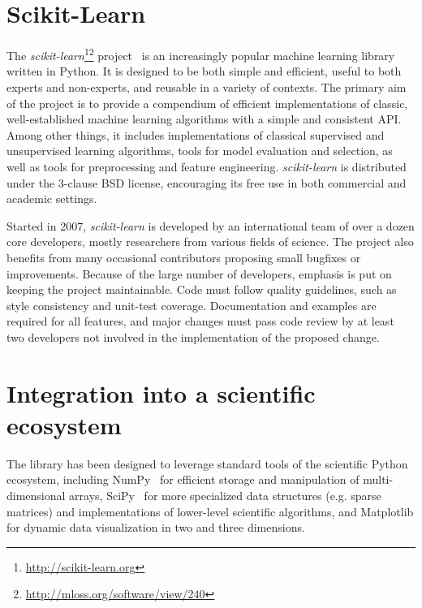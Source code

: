 \documentclass{article}
\newcommand{\sklearn}{\textit{scikit-learn}\xspace}
\begin{document}

\section*{Scikit-Learn}

The \sklearn\footnote{\url{http://scikit-learn.org}}\footnote{\url{http://mloss.org/software/view/240}} project~\citep{pedregosa2011} is an increasingly popular machine
learning library written in Python.  It is designed to be both  simple and
efficient, useful to both experts and non-experts, and reusable in a variety of
contexts. The  primary aim of the project is to provide a compendium of
efficient implementations of classic, well-established  machine learning
algorithms with a simple and consistent API. Among other things, it includes
implementations of classical supervised and unsupervised learning algorithms,
tools for model evaluation and selection, as  well as tools for preprocessing
and feature engineering. \sklearn is distributed under the 3-clause  BSD
license, encouraging its free use in both commercial and academic settings.

Started in 2007, \sklearn is developed by an international team of over a dozen
core developers, mostly researchers from various fields of science. The project
also benefits from many occasional contributors proposing small bugfixes or
improvements. Because of the large number of developers, emphasis is put on
keeping the project maintainable. Code must follow quality guidelines, such as
style consistency and unit-test coverage. Documentation and examples are
required for all features, and major changes must pass code review by at least
two developers not involved in the implementation of the proposed change.


\section*{Integration into a scientific ecosystem}

The library has been designed to leverage standard tools of the scientific
Python ecosystem, including NumPy~\citep{vanderwalt2011} for efficient  storage
and manipulation of multi-dimensional arrays, SciPy~\citep{varoquaux2013scipy}
for more specialized data structures  (e.g. sparse matrices) and
implementations of lower-level scientific algorithms, and Matplotlib for
dynamic data visualization in two and three dimensions.
\end{document}
